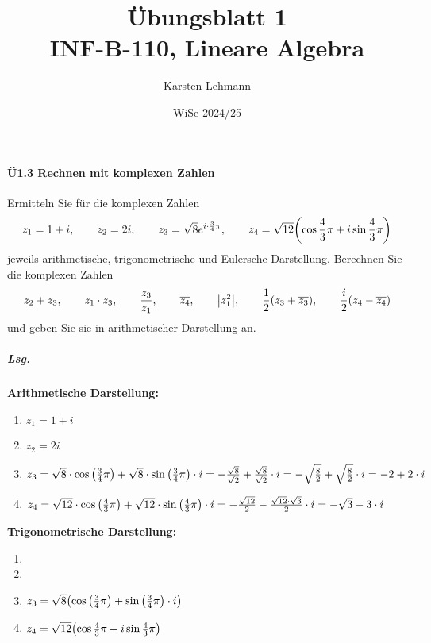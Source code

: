 \documentclass{scrreprt}
\author{Karsten Lehmann}
\date{WiSe 2024/25}
\title{Übungsblatt 1\\INF-B-110, Lineare Algebra}
\begin{document}
\paragraph{Ü1.3 Rechnen mit komplexen Zahlen}
Ermitteln Sie für die komplexen Zahlen
\[
  z_1 = 1 + i, \qquad
  z_2 = 2i, \qquad
  z_3 = \sqrt{8}e^{i \cdot \frac{3}{4}\pi}, \qquad
  z_4 = \sqrt{12}\qty(\cos\frac{4}{3}\pi + i\sin\frac{4}{3}\pi)
\]
jeweils arithmetische, trigonometrische und Eulersche Darstellung.
Berechnen Sie die komplexen Zahlen
\[
  z_2 + z_3, \qquad
  z_1 \cdot z_3, \qquad
  \frac{z_3}{z_1}, \qquad
  \overline{z_4}, \qquad
  \abs{z_1^2}, \qquad
  \frac{1}{2}\qty(z_3 + \overline{z_3}), \qquad
  \frac{i}{2}\qty(z_4 - \overline{z_4})
\]
und geben Sie sie in arithmetischer Darstellung an.

\subparagraph{Lsg.}
\textbf{Arithmetische Darstellung:}
\begin{enumerate}[(1)]
\item $z_1 = 1 + i$
\item $z_2 = 2i$
\item $z_3 = \sqrt{8} \cdot \cos\qty(\frac{3}{4}\pi) +
  \sqrt{8} \cdot \sin\qty(\frac{3}{4}\pi) \cdot i =
  -\frac{\sqrt{8}}{\sqrt{2}} + \frac{\sqrt{8}}{\sqrt{2}} \cdot i
  = - \sqrt{\frac{8}{2}} + \sqrt{\frac{8}{2}} \cdot i
  = -2 + 2 \cdot i$
\item $z_4 = \sqrt{12} \cdot \cos\qty(\frac{4}{3}\pi) +
  \sqrt{12} \cdot \sin\qty(\frac{4}{3}\pi) \cdot i =
  -\frac{\sqrt{12}}{2} - \frac{\sqrt{12} \cdot \sqrt{3}}{2} \cdot i
  = -\sqrt{3} - 3 \cdot i$
\end{enumerate}
\textbf{Trigonometrische Darstellung:}
\begin{enumerate}[(1)]
\item
\item

\item $z_3 = \sqrt{8}\qty(\cos\qty(\frac{3}{4}\pi) + \sin\qty(\frac{3}{4}\pi) \cdot i)$
\item $z_4 = \sqrt{12}\qty(\cos\frac{4}{3}\pi + i\sin\frac{4}{3}\pi)$
\end{enumerate}
\end{document}
